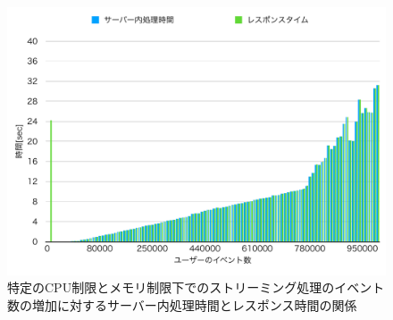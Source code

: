 \documentclass[../../../../../../main]{subfiles}
\begin{document}
    \begin{figure}[H]
        \centering
        \includegraphics[width=12cm]{graph}
        \caption{特定のCPU制限とメモリ制限下でのストリーミング処理のイベント数の増加に対するサーバー内処理時間とレスポンス時間の関係}
        \label{fig:stream-time-app_1_1024-db_1_1024}
    \end{figure}
\end{document}
